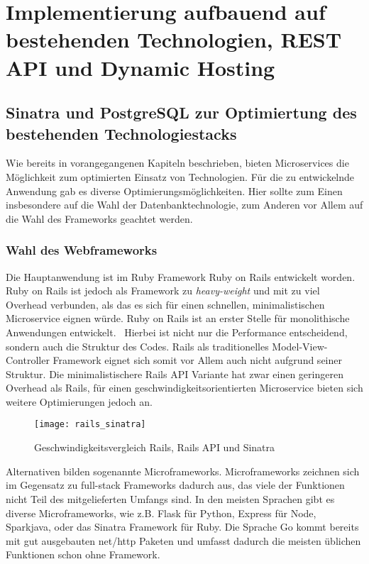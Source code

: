 \chapter{Implementierung aufbauend auf bestehenden Technologien, REST API und Dynamic Hosting}

\section{Sinatra und PostgreSQL zur Optimiertung des bestehenden Technologiestacks}
Wie bereits in vorangegangenen Kapiteln beschrieben, bieten Microservices die Möglichkeit zum optimierten Einsatz von Technologien. Für die zu entwickelnde Anwendung gab es diverse Optimierungsmöglichkeiten. Hier sollte zum Einen insbesondere auf die Wahl der Datenbanktechnologie, zum Anderen vor Allem auf die Wahl des Frameworks geachtet werden.

\subsection{Wahl des Webframeworks}
Die Hauptanwendung ist im Ruby Framework Ruby on Rails\cite{rails} entwickelt worden. Ruby on Rails ist jedoch als Framework zu \textit{heavy-weight} und mit zu viel Overhead verbunden, als das es sich für einen schnellen, minimalistischen Microservice eignen würde. Ruby on Rails ist an erster Stelle für monolithische Anwendungen entwickelt.~\cite[][]{rails:doctrine}
Hierbei ist nicht nur die Performance entscheidend, sondern auch die Struktur des Codes. Rails als traditionelles Model-View-Controller Framework\cite[][]{wiki:mvc} eignet sich somit vor Allem auch nicht aufgrund seiner Struktur. Die minimalistischere Rails API Variante\cite{rails:api} hat zwar einen geringeren Overhead als Rails, für einen geschwindigkeitsorientierten Microservice bieten sich weitere Optimierungen jedoch an.

\begin{figure}[!ht]
    \centering
    \caption{Geschwindigkeitsvergleich Rails, Rails API und Sinatra \cite{newrelic:soa}}
    \label{fig:speed}
    \texttt{[image: rails\_sinatra]}
\end{figure}

Alternativen bilden sogenannte Microframeworks\cite{wiki:micro}. Microframeworks zeichnen sich im Gegensatz zu full-stack Frameworks dadurch aus, das viele der Funktionen nicht Teil des mitgelieferten Umfangs sind. In den meisten Sprachen gibt es diverse Microframeworks, wie z.B. Flask\cite{flask} für Python, Express\cite{expressjs} für Node, Sparkjava\cite{sparkjava}, oder das Sinatra Framework\cite{sinatra} für Ruby. Die Sprache Go\cite{golang} kommt bereits mit gut ausgebauten net/http Paketen und umfasst dadurch die meisten üblichen Funktionen schon ohne Framework.

